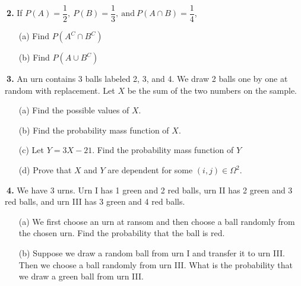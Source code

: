 \documentclass[12pt]{report}
\begin{document}
\noindent {} $~$\textbf{2.} If $P(A)=\dfrac{1}{2},~P(B)=\dfrac{1}{3},~\text{and}~P(A\cap B)=\dfrac{1}{4}$,
\begin{itemize}
\item [(a)] Find $P(A^C\cap B^C)$		%
\item [(b)] Find $P(A \cup B^C)$			%
\end{itemize}
\pagebreak





\noindent {} $~$\textbf{3.} An urn contains 3 balls labeled 2, 3, and 4. We draw 2 balls one by one at random with replacement. Let $X$ be the sum of the two numbers on the sample.
\begin{itemize}
\item [(a)] Find the possible values of $X$.		%
\item [(b)] Find the probability mass function of $X$.			%
\item [(c)] Let $Y=3X-21$. Find the probability mass function of $Y$			%
\item [(d)] Prove that $X$ and $Y$ are dependent for some $(i,j)\in\Omega^2$.			%
\end{itemize}
\pagebreak







\noindent {} $~$\textbf{4.} We have 3 urns. Urn I has 1 green and 2 red balls, urn II has 2 green and 3 red balls, and urn III has 3 green and 4 red balls. 
\begin{itemize}
\item [(a)] We first choose an urn at ransom and then choose a ball randomly from the chosen urn. Find the probability that the ball is red. %
\item [(b)] Suppose we draw a random ball from urn I and transfer it to urn III. Then we choose a ball randomly from urn III. What is the probability that we draw a green ball from urn III.
\end{itemize}
\pagebreak
\end{document}
